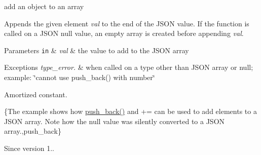 add an object to an array 

Appends the given element {\itshape val} to the end of the J\+S\+ON value. If the function is called on a J\+S\+ON null value, an empty array is created before appending {\itshape val}.


\begin{DoxyParams}[1]{Parameters}
\mbox{\tt in}  & {\em val} & the value to add to the J\+S\+ON array\\
\hline
\end{DoxyParams}

\begin{DoxyExceptions}{Exceptions}
{\em type\+\_\+error.} & when called on a type other than J\+S\+ON array or null; example\+: {\ttfamily \char`\"{}cannot use push\+\_\+back() with number\char`\"{}}\\
\hline
\end{DoxyExceptions}
Amortized constant.

\{The example shows how {\ttfamily \mbox{\hyperlink{classnlohmann_1_1basic__json_ac8e523ddc8c2dd7e5d2daf0d49a9c0d7}{push\+\_\+back()}}} and {\ttfamily +=} can be used to add elements to a J\+S\+ON array. Note how the {\ttfamily null} value was silently converted to a J\+S\+ON array.,push\+\_\+back\}

\begin{DoxySince}{Since}
version 1.. 
\end{DoxySince}
\mbox{\label{classnlohmann_1_1basic__json_ab4384af330b79de0e5f279576803a2c7}} 

